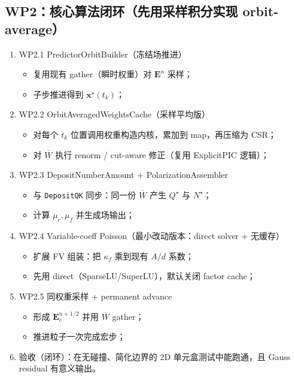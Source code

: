 \documentclass[UTF8,a4paper,12pt]{ctexart}
\newcommand{\code}[1]{\texttt{#1}}
\begin{document}
\subsection*{WP2：核心算法闭环（先用采样积分实现 orbit-average）}
\begin{enumerate}[leftmargin=2em]
  \item WP2.1 PredictorOrbitBuilder（冻结场推进）
  \begin{itemize}
    \item 复用现有 gather（瞬时权重）对 $\bm{E}^n$ 采样；
    \item 子步推进得到 $\bm{x}^\star(t_k)$；
  \end{itemize}

  \item WP2.2 OrbitAveragedWeightsCache（采样平均版）
  \begin{itemize}
    \item 对每个 $t_k$ 位置调用权重构造内核，累加到 map，再压缩为 CSR；
    \item 对 $\overline{W}$ 执行 renorm / cut-aware 修正（复用 ExplicitPIC 逻辑）；
  \end{itemize}

  \item WP2.3 DepositNumberAmount + PolarizationAssembler
  \begin{itemize}
    \item 与 \code{DepositQK} 同步：同一份 $\overline{W}$ 产生 $Q^\star$ 与 $N^\star$；
    \item 计算 $\mu_c,\mu_f$ 并生成场输出；
  \end{itemize}

  \item WP2.4 Variable-coeff Poisson（最小改动版本：direct solver + 无缓存）
  \begin{itemize}
    \item 扩展 FV 组装：把 $\kappa_f$ 乘到现有 $A/d$ 系数；
    \item 先用 direct（SparseLU/SuperLU），默认关闭 factor cache；
  \end{itemize}

  \item WP2.5 同权重采样 + permanent advance
  \begin{itemize}
    \item 形成 $\bm{E}_c^{n+1/2}$ 并用 $\overline{W}$ gather；
    \item 推进粒子一次完成宏步；
  \end{itemize}

  \item 验收（闭环）：在无碰撞、简化边界的 2D 单元盒测试中能跑通，且 Gauss residual 有意义输出。
\end{enumerate}
\end{document}
